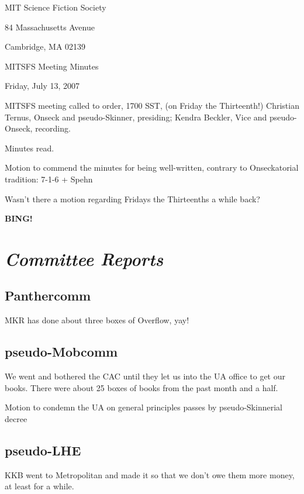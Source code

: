 \documentclass[10pt]{article}
\newcommand{\bing}{{\bf BING!} }
\newcommand{\goto}[1]{\bing \vskip 12pt \section*{{\em{#1}}}}
\begin{document}
\begin{center}

MIT Science Fiction Society

84 Massachusetts Avenue

Cambridge, MA 02139

\vspace{12pt}

MITSFS Meeting Minutes

Friday, July 13, 2007

\end{center}

\vspace{18pt}

\setlength{\parskip}{6pt}

\noindent
MITSFS meeting called to order, 1700 SST, (on Friday the Thirteenth!)
Christian Ternus, Onseck and pseudo-Skinner, presiding; Kendra Beckler, Vice and pseudo-Onseck, recording.

Minutes read.

Motion to commend the minutes for being well-written, contrary to Onseckatorial tradition: 7-1-6 + Spehn

Wasn't there a motion regarding Fridays the Thirteenths a while back?

\goto{Committee Reports}

\subsection*{Panthercomm}

MKR has done about three boxes of Overflow, yay!

\subsection*{pseudo-Mobcomm}

We went and bothered the CAC until they let us into the UA office to get our books.  There were about 25 boxes of books from the past month and a half.

Motion to condemn the UA on general principles passes by pseudo-Skinnerial decree

\subsection*{pseudo-LHE}

KKB went to Metropolitan and made it so that we don't owe them more money, at least for a while.
\end{document}
